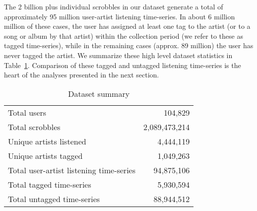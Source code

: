 The 2 billion plus individual scrobbles in our dataset generate a total of approximately 95 million user-artist listening time-series. In about 6 million million of these cases, the user has assigned at least one tag to the artist (or to a song or album by that artist) within the collection period (we refer to these as tagged time-series), while in the remaining cases (approx. 89 million) the user has never tagged the artist. We summarize these high level dataset statistics in Table~\ref{tab:data_summary}. Comparison of these tagged and untagged listening time-series is the heart of the analyses presented in the next section.

\begin{table}[h]
\begin{center}
\begin{tabular}{l|r}
\toprule
Total users & 104,829 \\
Total scrobbles & 2,089,473,214 \\
Unique artists listened & 4,444,119 \\
Unique artists tagged & 1,049,263 \\
\midrule
Total user-artist listening time-series & 94,875,106 \\
Total tagged time-series & 5,930,594 \\
Total untagged time-series & 88,944,512 \\
\bottomrule
\end{tabular}
\end{center}
\caption{Dataset summary}
\label{tab:data_summary}
\end{table}

